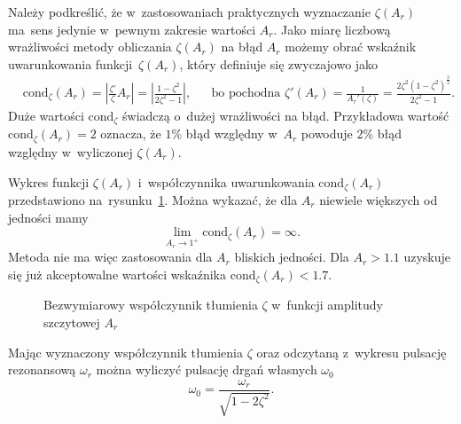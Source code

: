\documentclass[paper=a4,DIV=12]{lpas}
\begin{document}
\begin{appendices}
  Należy podkreślić, że w~zastosowaniach praktycznych wyznaczanie $\zeta(A_r)$
  ma~sens jedynie w~pewnym zakresie wartości $A_r$.
  Jako miarę liczbową wrażliwości metody obliczania $\zeta(A_r)$ na błąd $A_r$
  możemy obrać wskaźnik uwarunkowania funkcji~$\zeta(A_r)$, który definiuje się
  zwyczajowo jako
  \begin{equation}
    \begin{aligned}
      &
      \text{cond}_{\zeta}(A_r)
        = \left|\frac{\zeta'}{\zeta} A_r\right|
        = \left|\frac{1-\zeta^2}{2\zeta^2-1}\right|,
      &&
      \text{bo pochodna }\zeta'(A_r)
        = \frac{1}{A_r'(\zeta)}
        = \frac{2 \zeta^2 (1-\zeta^2)^{\frac{3}{2}}}{2 \zeta^2 - 1}.
      &
    \end{aligned}
    \label{eq:HY93S}
  \end{equation}
  Duże wartości $\text{cond}_{\zeta}$ świadczą o~dużej wrażliwości na błąd.
  Przykładowa wartość $\text{cond}_{\zeta}(A_r) = 2$ oznacza, że $1\%$ błąd
  względny w~$A_r$ powoduje $2\%$ błąd względny w~wyliczonej $\zeta(A_r)$.

  Wykres funkcji $\zeta(A_r)$ i~współczynnika uwarunkowania
  $\text{cond}_{\zeta}(A_r)$ przedstawiono na~rysunku~\ref{fig:5O32M}. Można
  wykazać, że dla $A_r$ niewiele większych od jedności mamy
  \begin{equation}
    \lim_{A_r \to 1^{+}} \text{cond}_{\zeta}(A_r) = \infty.
    \label{eq:77ILN}
  \end{equation}
  Metoda nie ma więc zastosowania dla $A_r$ bliskich jedności. Dla $A_r > 1.1$
  uzyskuje się już akceptowalne wartości wskaźnika $\text{cond}_{\zeta}(A_r) < 1.7$.
  \begin{figure}[H]
    \centering
    
    \caption{Bezwymiarowy współczynnik tłumienia $\zeta$ w~funkcji amplitudy
             szczytowej $A_r$}
    \label{fig:5O32M}
  \end{figure}

  Mając wyznaczony współczynnik tłumienia $\zeta$ oraz odczytaną z~wykresu
  pulsację rezonansową $\omega_r$ można wyliczyć pulsację drgań własnych
  $\omega_0$
  \begin{equation}
    \omega_0 = \frac{\omega_r}{\sqrt{1 - 2\zeta^2}}.
    \label{eq:GIWGJ}
  \end{equation}


\end{appendices}
\end{document}
